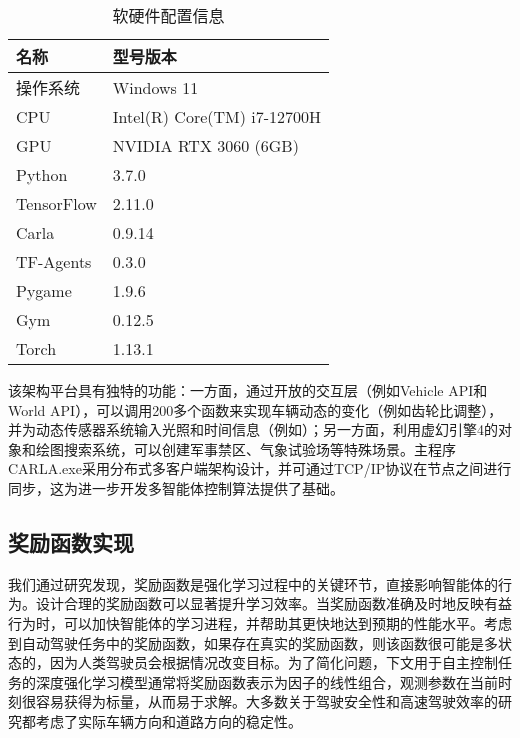\begin{table}[htbp]
	\centering
	\caption{软硬件配置信息}
	\label{tab:config}
	\begin{tabular}{ll}
		\toprule
		\textbf{名称}         & \textbf{型号版本}               \\
		\midrule
		操作系统            & Windows 11                     \\
		CPU               & Intel(R) Core(TM) i7-12700H    \\
		GPU               & NVIDIA RTX 3060 (6GB)          \\
		Python            & 3.7.0                          \\
		TensorFlow        & 2.11.0                         \\
		Carla             & 0.9.14                         \\
		TF-Agents         & 0.3.0                          \\
		Pygame            & 1.9.6                          \\
		Gym               & 0.12.5                         \\
		Torch             & 1.13.1                         \\
		\bottomrule
	\end{tabular}
\end{table}


该架构平台具有独特的功能：一方面，通过开放的交互层（例如Vehicle API和World API），可以调用200多个函数来实现车辆动态的变化（例如齿轮比调整），并为动态传感器系统输入光照和时间信息（例如）；另一方面，利用虚幻引擎4的对象和绘图搜索系统，可以创建军事禁区、气象试验场等特殊场景。主程序CARLA.exe采用分布式多客户端架构设计，并可通过TCP/IP协议在节点之间进行同步，这为进一步开发多智能体控制算法提供了基础。

\subsection{奖励函数实现}

我们通过研究发现，奖励函数是强化学习过程中的关键环节，直接影响智能体的行为。设计合理的奖励函数可以显著提升学习效率。当奖励函数准确及时地反映有益行为时，可以加快智能体的学习进程，并帮助其更快地达到预期的性能水平。考虑到自动驾驶任务中的奖励函数，如果存在真实的奖励函数，则该函数很可能是多状态的，因为人类驾驶员会根据情况改变目标。为了简化问题，下文用于自主控制任务的深度强化学习模型通常将奖励函数表示为因子的线性组合，观测参数在当前时刻很容易获得为标量，从而易于求解。大多数关于驾驶安全性和高速驾驶效率的研究都考虑了实际车辆方向和道路方向的稳定性。

